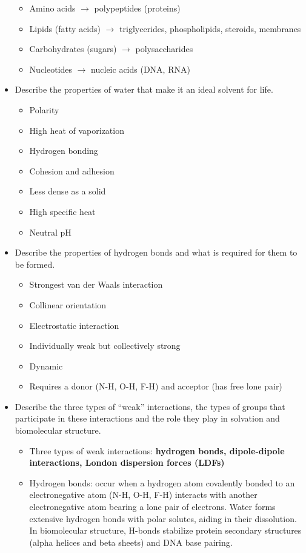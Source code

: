 \documentclass[letterpaper, 12pt]{article}
\begin{document}
\begin{itemize}
\begin{itemize}
\item Amino acids $\to$ polypeptides (proteins)
\item Lipids (fatty acids) $\to$ triglycerides, phospholipids, steroids, membranes
\item Carbohydrates (sugars) $\to$ polysaccharides
\item Nucleotides $\to$ nucleic acids (DNA, RNA)
\end{itemize}
\item Describe the properties of water that make it an ideal solvent for life.
\begin{itemize}
\item Polarity
\item High heat of vaporization
\item Hydrogen bonding
\item Cohesion and adhesion
\item Less dense as a solid
\item High specific heat
\item Neutral pH
\end{itemize}
\item Describe the properties of hydrogen bonds and what is required for them to be formed.
\begin{itemize}
\item Strongest van der Waals interaction
\item Collinear orientation
\item Electrostatic interaction
\item Individually weak but collectively strong
\item Dynamic
\item Requires a donor (N-H, O-H, F-H) and acceptor (has free lone pair)
\end{itemize}
\item Describe the three types of “weak” interactions, the types of groups that participate in these interactions and the role they play in solvation and biomolecular structure.
\begin{itemize}
\item Three types of weak interactions: \textbf{hydrogen bonds, dipole-dipole interactions, London dispersion forces (LDFs)}
\item Hydrogen bonds: occur when a hydrogen atom covalently bonded to an electronegative atom (N-H, O-H, F-H) interacts with another electronegative atom bearing a lone pair of electrons. Water forms extensive hydrogen bonds with polar solutes, aiding in their dissolution. In biomolecular structure, H-bonds stabilize protein secondary structures (alpha helices and beta sheets) and DNA base pairing.

\end{itemize}
\end{itemize}
\end{document}
